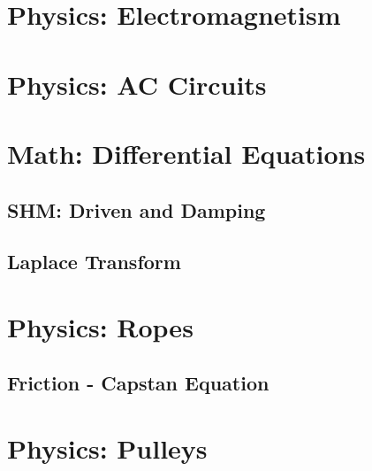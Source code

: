 \documentclass{article}
\begin{document}
\section{Physics: Electromagnetism}
\section{Physics: AC Circuits}

\section{Math: Differential Equations}
\subsection{SHM: Driven and Damping}
\subsection{Laplace Transform}

\section{Physics: Ropes}
\subsection{Friction - Capstan Equation}
\section{Physics: Pulleys}
\end{document}

